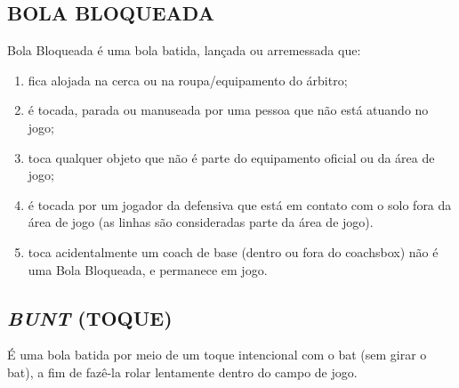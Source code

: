 \subsection{BOLA BLOQUEADA}
Bola Bloqueada é uma bola batida, lançada ou arremessada que:
\begin{enumerate}[label=(\alph*)]
	\item   fica alojada na cerca ou na roupa/equipamento do árbitro;
	\item  é tocada, parada ou manuseada por uma pessoa que não está atuando no jogo;
	\item  toca qualquer objeto que não é parte do equipamento oficial ou da área  de jogo;
	\item  é tocada por um jogador da defensiva que está em contato com o solo fora da área de jogo (as linhas são consideradas parte da área de jogo).
	\item  toca acidentalmente um \gls{coach} de base (dentro ou fora do \gls{coachsbox}) não é uma Bola Bloqueada, e permanece em jogo.
\end{enumerate}

\subsection{\textit{BUNT} (TOQUE)}
É uma bola batida por meio de um toque intencional com o \gls{bat} (sem girar o \gls{bat}), a fim de fazê-la rolar lentamente dentro do campo de jogo.
